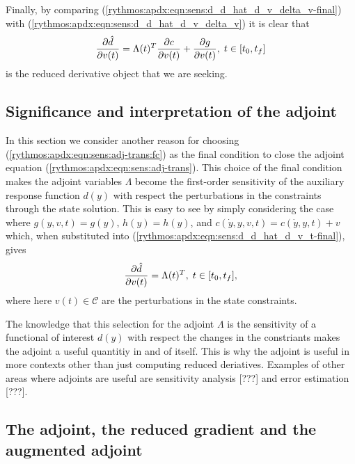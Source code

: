 \documentclass[pdf,ps2pdf,11pt]{SANDreport}
\begin{document}
Finally, by comparing (\ref{rythmos:apdx:eqn:sens:d_d_hat_d_v_delta_v-final})
with (\ref{rythmos:apdx:eqn:sens:d_d_hat_d_v_delta_v}) it is clear that
%
\begin{equation}
\displaystyle{\frac{\partial \hat{d}}{\partial v(t)}} = \Lambda(t)^T \displaystyle{\frac{\partial c}{\partial v(t)}} + \displaystyle{\frac{\partial g}{\partial v(t)}}, \; t\in[t_0,t_f]
\label{rythmos:apdx:eqn:sens:d_d_hat_d_v_t-final}
\end{equation}
%
is the reduced derivative object that we are seeking.

\subsection{Significance and interpretation of the adjoint}

In this section we consider another reason for choosing
(\ref{rythmos:apdx:eqn:sens:adj-trans:fc}) as the final condition to close the
adjoint equation (\ref{rythmos:apdx:eqn:sens:adj-trans}).  This choice of the
final condition makes the adjoint variables $\Lambda$ become the first-order
sensitivity of the auxiliary response function $d(y)$ with respect the
perturbations in the constraints through the state solution.  This is easy to
see by simply considering the case where $g(y,v,t) = g(y)$, $h(y) = h(y)$, and
$c(\dot{y},y,v,t) = c(\dot{y},y,t) + v$ which, when substituted into
(\ref{rythmos:apdx:eqn:sens:d_d_hat_d_v_t-final}), gives
%
\begin{equation}
\displaystyle{\frac{\partial \hat{d}}{\partial v(t)}} = \Lambda(t)^T , \; t\in[t_0,t_f],
\label{rythmos:apdx:eqn:sens:adjoint_interpretation}
\end{equation}
%
where here $v(t)\in\mathcal{C}$ are the perturbations in the state
constraints.

The knowledge that this selection for the adjoint $\Lambda$ is the sensitivity
of a functional of interest $d(y)$ with respect the changes in the constriants
makes the adjoint a useful quantitiy in and of itself.  This is why the
adjoint is useful in more contexts other than just computing reduced
deriatives.  Examples of other areas where adjoints are useful are sensitivity
analysis [???] and error estimation [???].

\subsection{The adjoint, the reduced gradient and the augmented adjoint}
\end{document}
